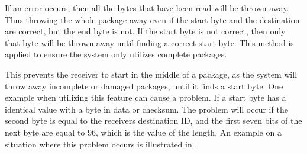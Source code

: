 If an error occurs, then all the bytes that have been read will be thrown away. Thus throwing the whole package away even if the start byte and the destination are correct, but the end byte is not. If the start byte is not correct, then only that byte will be thrown away until finding a correct start byte. This method is applied to ensure the system only utilizes complete packages.

This prevents the receiver to start in the middle of a package, as the system will throw away incomplete or damaged packages, until it finds a start byte. One example when utilizing this feature can cause a problem. If a start byte has a identical value with a byte in data or checksum. The problem will occur if the second byte is equal to the receivers destination ID, and the first seven bits of the next byte are equal to 96, which is the value of the length. An example on a situation where this problem occurs is illustrated in .

